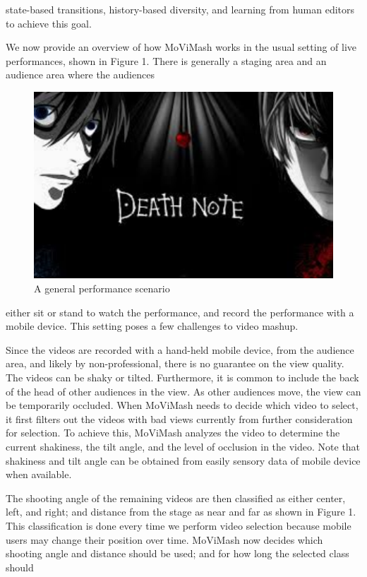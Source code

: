 \documentclass{sig-alternate-05-2015}
\begin{document}
state-based transitions, history-based diversity, and learning from
human editors to achieve this goal.\par
We now provide an overview of how MoViMash works in the
usual setting of live performances, shown in Figure 1. There is
generally a staging area and an audience area where the audiences
\begin{figure}
\centering
\includegraphics{note.pdf}
\caption{A general performance scenario}
\end{figure}
either sit or stand to watch the performance, and record the performance
with a mobile device. This setting poses a few challenges to
video mashup.\par
Since the videos are recorded with a hand-held mobile device,
from the audience area, and likely by non-professional, there is no
guarantee on the view quality. The videos can be shaky or tilted.
Furthermore, it is common to include the back of the head of other
audiences in the view. As other audiences move, the view can be
temporarily occluded. When MoViMash needs to decide which
video to select, it first filters out the videos with bad views currently
from further consideration for selection. To achieve this, MoViMash
analyzes the video to determine the current shakiness, the tilt
angle, and the level of occlusion in the video. Note that shakiness
and tilt angle can be obtained from easily sensory data of mobile
device when available.\par
The shooting angle of the remaining videos are then classified as
either center, left, and right; and distance from the stage as near and
far as shown in Figure 1. This classification is done every time we
perform video selection because mobile users may change their position
over time. MoViMash now decides which shooting angle and
distance should be used; and for how long the selected class should
\end{document}
